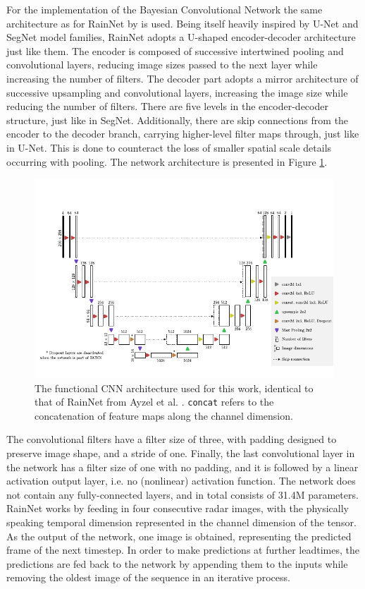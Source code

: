 For the implementation of the Bayesian Convolutional Network the same architecture as for RainNet by \citet{ayzel_rainnet_nodate} is used. Being itself heavily inspired by U-Net and SegNet model families, RainNet adopts a U-shaped encoder-decoder architecture just like them. The encoder is composed of successive intertwined pooling and convolutional layers, reducing image sizes passed to the next layer while increasing the number of filters. The decoder part adopts a mirror architecture of successive upsampling and convolutional layers, increasing the image size while reducing the number of filters. There are five levels in the encoder-decoder structure, just like in SegNet. Additionally, there are skip connections from the encoder to the decoder branch, carrying higher-level filter maps through, just like in U-Net. This is done to counteract the loss of smaller spatial scale details occurring with pooling. The network architecture is presented in Figure \ref{fig:rainnet}.

\begin{figure}[h]
	\centering
	\includegraphics[scale=1]{images/rainnet_arch/rainnet_arch}
	\caption{The functional CNN architecture used for this work, identical to that of RainNet from Ayzel et al. \cite{ayzel_rainnet_nodate}. \texttt{concat} refers to the concatenation of feature maps along the channel dimension.}
	\label{fig:rainnet}
\end{figure}

The convolutional filters have a filter size of three, with padding designed to preserve image shape, and a stride of one. Finally, the last convolutional layer in the network has a filter size of one with no padding, and it is followed by a linear activation output layer, i.e. no (nonlinear) activation function. The network does not contain any fully-connected layers, and in total consists of 31.4M parameters. RainNet works by feeding in four consecutive radar images, with the physically speaking temporal dimension represented in the channel dimension of the tensor. As the output of the network, one image is obtained, representing the predicted frame of the next timestep. In order to make predictions at further leadtimes, the predictions are fed back to the network by appending them to the inputs while removing the oldest image of the sequence in an iterative process. 

